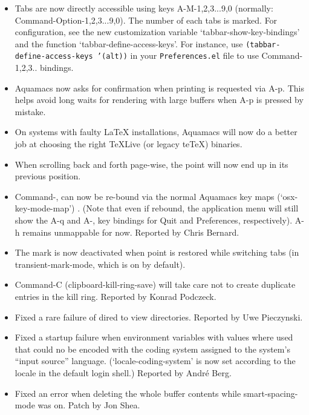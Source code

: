\begin{itemize}

\item Tabs are now directly accessible using keys A-M-1,2,3...9,0 (normally: Command-Option-1,2,3...9,0).  The number of each tabs is marked.  For configuration, see the new customization variable `tabbar-show-key-bindings' and the function `tabbar-define-access-keys'.   For instance, use {\tt (tabbar-define-access-keys '(alt))} in your {\tt Preferences.el} file to use Command-1,2,3.. bindings.

\item Aquamacs now asks for confirmation when printing is requested via A-p.  This helps avoid long waits for rendering with large buffers when A-p is pressed by mistake.

\item On systems with faulty LaTeX installations, Aquamacs will now do a better job at choosing the right TeXLive (or legacy teTeX) binaries.

\item When scrolling back and forth page-wise, the point will now end up in its previous position.

\item Command-, can now be re-bound via the normal Aquamacs key maps (`osx-key-mode-map') .  (Note that even if rebound, the application menu will still show the A-q and A-, key bindings for Quit and Preferences, respectively).  A-h remains unmappable for now.
Reported by Chris Bernard.

\item The mark is now deactivated when point is restored while switching tabs (in transient-mark-mode, which is on by default).

\item Command-C (clipboard-kill-ring-save) will take care not to create duplicate entries in the kill ring.
Reported by Konrad Podczeck.

\item Fixed a rare failure of dired to view directories.
Reported by Uwe Pieczynski.

\item Fixed a startup failure when environment variables with values where used that could no be encoded with the coding system assigned to the system's ``input source'' language.  (`locale-coding-system' is now set according to the locale in the default login shell.)
Reported by André Berg.

\item Fixed an error when deleting the whole buffer contents while smart-spacing-mode was on.
Patch by Jon Shea.


\end{itemize}
